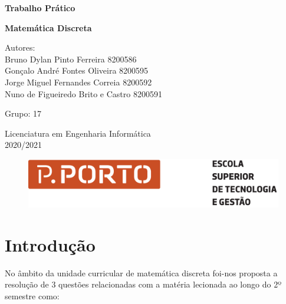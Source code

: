 \documentclass[12pt]{article}
\begin{document}
    \begin{center}
        \vspace*{1cm}
            
        \Huge
        \textbf{Trabalho Prático}
        
        \vspace{0.5cm}
        \textbf{Matemática Discreta}     
        
        \vspace{1.5cm}
        \Large{Autores: \\
        Bruno Dylan Pinto Ferreira 8200586\\
        Gonçalo André Fontes Oliveira 8200595 \\ 
        Jorge Miguel Fernandes Correia 8200592\\
        Nuno de Figueiredo Brito e Castro 8200591}
        
        \vspace{0.5cm}
        \Large{Grupo: 17}
        
        \vspace{0.5cm}
         \Large{Licenciatura em Engenharia Informática \\ 2020/2021}
          \vspace{1.5cm}
         \begin{figure}[h!]\centering
            \includegraphics[scale=0.4]{anexos/logo_estg.png}
        \end{figure}
         
        \thispagestyle{empty}
    \end{center}
    
    \newpage
    \renewcommand{\contentsname}{Índice}
    \tableofcontents
    \newpage
    \section{Introdução}
    
     \noindent No âmbito da unidade curricular de matemática discreta foi-nos proposta a resolução de 3 questões relacionadas com a matéria lecionada ao longo do 2º semestre como:
\end{document}
